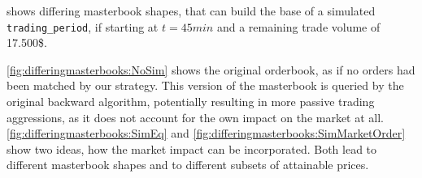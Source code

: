  shows differing masterbook shapes, that can build the base of a simulated \lstinline!trading_period!, \eg if starting at $t=45min$ and a remaining trade volume of 17.500\$.

\ref{fig:differingmasterbooks:NoSim} shows the original orderbook, as if no orders had been matched by our strategy. This version of the masterbook is queried by the original backward algorithm, potentially resulting in more passive trading aggressions, as it does not account for the own impact on the market at all. \ref{fig:differingmasterbooks:SimEq} and \ref{fig:differingmasterbooks:SimMarketOrder} show two ideas, how the market impact can be incorporated. Both lead to different masterbook shapes and to different subsets of attainable prices.\\

